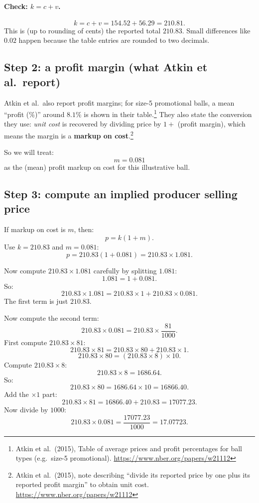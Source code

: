 \documentclass[11pt]{article}
\newcommand{\cconst}{c} %
\newcommand{\vvar}{v}   %
\newcommand{\kcost}{k}  %
\begin{document}
\paragraph{Check: \(\kcost=\cconst+\vvar\).}
\[
  \kcost=\cconst+\vvar=154.52+56.29=210.81.
\]
This is (up to rounding of cents) the reported total \(210.83\). Small differences like \(0.02\) happen because
the table entries are rounded to two decimals.

\subsection{Step 2: a profit margin (what Atkin et al.\ report)}
Atkin et al.\ also report profit margins; for size-5 promotional balls, a mean ``profit (\%)'' around \(8.1\%\) is shown in their table.\footnote{Atkin et al.\ (2015), Table of average prices and profit percentages for ball types (e.g.\ size-5 promotional). \url{https://www.nber.org/papers/w21112}}
They also state the conversion they use: \emph{unit cost} is recovered by dividing price by \(1+\) (profit margin),
which means the margin is a \textbf{markup on cost}.\footnote{Atkin et al.\ (2015), note describing ``divide its reported price by one plus its reported profit margin'' to obtain unit cost. \url{https://www.nber.org/papers/w21112}}

So we will treat:
\[
  m = 0.081
\]
as the (mean) profit markup on cost for this illustrative ball.

\subsection{Step 3: compute an implied producer selling price}
If markup on cost is \(m\), then:
\[
  p = \kcost(1+m).
\]
Use \(\kcost=210.83\) and \(m=0.081\):
\[
  p = 210.83(1+0.081)=210.83\times 1.081.
\]

Now compute \(210.83\times 1.081\) carefully by splitting \(1.081\):
\[
  1.081 = 1 + 0.081.
\]
So:
\[
  210.83\times 1.081 = 210.83\times 1 + 210.83\times 0.081.
\]
The first term is just \(210.83\).

Now compute the second term:
\[
  210.83\times 0.081 = 210.83\times \frac{81}{1000}.
\]
First compute \(210.83\times 81\):
\[
  210.83\times 81 = 210.83\times 80 + 210.83\times 1.
\]
\[
  210.83\times 80 = (210.83\times 8)\times 10.
\]
Compute \(210.83\times 8\):
\[
  210.83\times 8 = 1686.64.
\]
So:
\[
  210.83\times 80 = 1686.64\times 10 = 16866.40.
\]
Add the \(\times 1\) part:
\[
  210.83\times 81 = 16866.40 + 210.83 = 17077.23.
\]
Now divide by \(1000\):
\[
  210.83\times 0.081 = \frac{17077.23}{1000} = 17.07723.
\]
\end{document}
